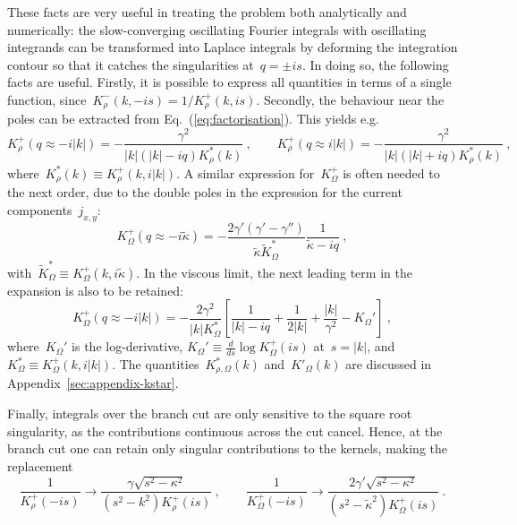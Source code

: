 \documentclass[preprint,aps,eqsecnum, prb]{revtex4-1}
\newcommand{\fplus}[1]{{#1}^{+}}
\newcommand{\fminus}[1]{{#1}^{-}}
\begin{document}
These facts are very useful in treating the problem both analytically and
numerically: the slow-converging oscillating Fourier integrals with
oscillating integrands can be transformed into Laplace
integrals by deforming the integration contour so that
it catches the singularities at~$q = \pm is$.
In doing so, the following facts are useful. Firstly,
it is possible to express all quantities in terms of a single function,
 since~$\fminus{K}_\rho(k, -is) = 1/\fplus{K}_\rho(k, is)$.  Secondly,
the behaviour near the poles can be extracted from
Eq.~(\ref{eq:factorisation}). This yields e.g. \begin{equation}
  \fplus{K}_\rho (q \approx -i |k|)
  = - \frac{\gamma^2}{|k|(|k| - i q) K_\rho^\ast(k)}
  \ ,
  \qquad
  \fplus{K}_{\rho}(q \approx i |k|) = - \frac{\gamma^2}{|k|(|k| + iq)
    K_\rho^\ast(k)}
  \ ,
\end{equation}
 where~$K_\rho^\ast(k) \equiv \fplus{K}_\rho(k, i|k|)$. A similar expression
 for~$\fplus{K}_\Omega$ is often needed to the next order, due to the double poles in the expression for the current components~$j_{x, y}$:
 \begin{equation}
 \fplus{K}_\Omega(q \approx -i {\tilde \kappa})
 = - \frac{2 \gamma' (\gamma' - \gamma'') }{{\tilde \kappa}
     {\tilde K}_\Omega^\ast}
      \frac{1}{{\tilde \kappa} - i q}
 \ ,
\end{equation}
with~${\tilde K}_\Omega^\ast \equiv \fplus{K}_\Omega(k, i{\tilde \kappa})$.
In the viscous limit, the next leading term in the expansion
is also to be retained:
 \begin{equation}
 \fplus{K}_\Omega(q \approx -i |k|)
 = - \frac{2 \gamma^2 }{|k| K_\Omega^\ast}
      \left[
      \frac{1}{|k| - i q}
       + \frac{1}{2|k|} + \frac{|k|}{\gamma^2} - K_\Omega'\right]
 \ ,
\end{equation}
where~$K_\Omega'$ is the log-derivative,
$K_\Omega' \equiv \frac{d}{ds} \log \fplus{K}_\Omega(is)$ at~$s = |k|$,
and~$K_\Omega^\ast \equiv \fplus{K}_\Omega(k, i|k|)$.
The quantities~$K_{\rho,\Omega}^\ast(k)$ and~$K'_\Omega(k)$ are discussed
in Appendix~\ref{sec:appendix-kstar}.

Finally, integrals over the branch cut are only sensitive
to the square root singularity, as the contributions continuous
across the cut cancel.
Hence, at the branch cut one can retain only singular contributions
to the kernels, making the replacement
\begin{equation}
  \frac{1}{\fplus{K}_\rho (-is)} \to
   \frac{\gamma\sqrt{s^2 - \kappa^2}}{(s^2 - k^2) \fplus{K}_\rho(is)}
  \ , \qquad
  \frac{1}{\fplus{K}_\Omega(-is)} \to
  \frac{2 \gamma' \sqrt{s^2 - \kappa^2}}{(s^2 - {\tilde \kappa}^2)
  \fplus{K}_\Omega(is)}
  \ .
\end{equation}
\end{document}
